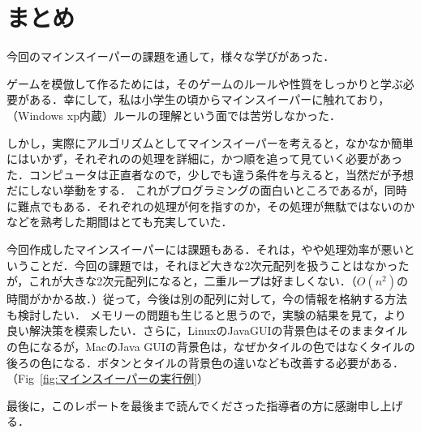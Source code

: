 \documentclass[a4j,11pt]{jsarticle}
\newcommand{\figref}[1]{Fig\ \ref{#1}}
\begin{document}
\part{まとめ}
今回のマインスイーパーの課題を通して，様々な学びがあった．\par
ゲームを模倣して作るためには，そのゲームのルールや性質をしっかりと学ぶ必要がある．幸にして，私は小学生の頃からマインスイーパーに触れており，（Windows xp内蔵）ルールの理解という面では苦労しなかった．\par
しかし，実際にアルゴリズムとしてマインスイーパーを考えると，なかなか簡単にはいかず，それぞれのの処理を詳細に，かつ順を追って見ていく必要があった．コンピュータは正直者なので，少しでも違う条件を与えると，当然だが予想だにしない挙動をする．
これがプログラミングの面白いところであるが，同時に難点でもある．それぞれの処理が何を指すのか，その処理が無駄ではないのかなどを熟考した期間はとても充実していた．\par
今回作成したマインスイーパーには課題もある．それは，やや処理効率が悪いということだ．今回の課題では，それほど大きな2次元配列を扱うことはなかったが，これが大きな2次元配列になると，二重ループは好ましくない．（\(O(n^2)\)の時間がかかる故．）従って，今後は別の配列に対して，今の情報を格納する方法も検討したい．
メモリーの問題も生じると思うので，実験の結果を見て，より良い解決策を模索したい．さらに，LinuxのJavaGUIの背景色はそのままタイルの色になるが，MacのJava GUIの背景色は，なぜかタイルの色ではなくタイルの後ろの色になる．ボタンとタイルの背景色の違いなども改善する必要がある．（\figref{fig:マインスイーパーの実行例}）\par
最後に，このレポートを最後まで読んでくださった指導者の方に感謝申し上げる．
\end{document}
